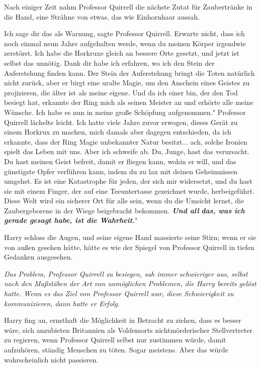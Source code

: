 Nach einiger Zeit nahm Professor Quirrell die nächste Zutat für Zaubertränke in
die Hand, eine Strähne von etwas, das wie Einhornhaar aussah.

\glqq Ich sage dir das als Warnung\grqq{}, sagte Professor Quirrell. \glqq
Erwarte nicht, dass ich noch einmal neun Jahre aufgehalten werde, wenn du meinen
Körper irgendwie zerstörst. Ich habe die Horkruxe gleich an bessere Orte
gesetzt, und jetzt ist selbst das unnötig. Dank dir habe ich erfahren, wo ich
den Stein der Auferstehung finden kann. Der Stein der Auferstehung bringt die
Toten natürlich nicht zurück, aber er birgt eine uralte Magie, um den Anschein
eines Geistes zu projizieren, die älter ist als meine eigene. Und da ich einer
bin, der den Tod besiegt hat, erkannte der Ring mich als seinen Meister an und
erhörte alle meine Wünsche. Ich habe es nun in meine große Schöpfung
aufgenommen." Professor Quirrell lächelte leicht. \glqq Ich hatte viele Jahre
zuvor erwogen, dieses Gerät zu einem Horkrux zu machen, mich damals aber dagegen
entschieden, da ich erkannte, dass der Ring Magie unbekannter Natur besitzt...
ach, solche Ironien spielt das Leben mit uns. Aber ich schweife ab. Du, Junge,
hast das verursacht. Du hast meinen Geist befreit, damit er fliegen kann, wohin
er will, und das günstigste Opfer verführen kann, indem du zu lax mit deinen
Geheimnissen umgehst. Es ist eine Katastrophe für jeden, der sich mir
widersetzt, und du hast sie mit einem Finger, der auf eine Teeuntertasse
gezeichnet wurde, herbeigeführt. Diese Welt wird ein sicherer Ort für alle sein,
wenn du die Umsicht lernst, die Zaubergeborene in der Wiege beigebracht
bekommen. \textbf{\emph{Und all }}\textbf{\emph{das, was ich gerade gesagt habe,
ist die Wahrheit.}}"

Harry schloss die Augen, und seine eigene Hand massierte seine Stirn; wenn er
sie von außen gesehen hätte, hätte es wie der Spiegel von Professor Quirrell in
tiefen Gedanken ausgesehen.

\emph{Das Problem, Professor Quirrell zu besiegen, sah immer schwieriger aus,
selbst nach den Maßstäben der Art von unmöglichen Problemen, die Harry bereits
gelöst hatte. Wenn es das Ziel von Professor Quirrell war, diese Schwierigkeit
zu kommunizieren, dann hatte er Erfolg. }

Harry fing an, ernsthaft die Möglichkeit in Betracht zu ziehen, dass es besser
wäre, sich anzubieten Britannien als Voldemorts nichtmörderischer Stellvertreter
zu regieren, wenn Professor Quirrell selbst nur zustimmen würde, damit
aufzuhören, ständig Menschen zu töten. Sogar meistens. Aber das würde
wahrscheinlich nicht passieren.

